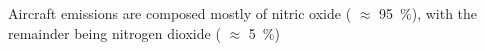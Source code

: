 Aircraft  emissions are composed mostly of nitric oxide ( $\approx$ 95~\%), with the remainder being nitrogen dioxide ( $\approx$ 5~\%) \cite{}